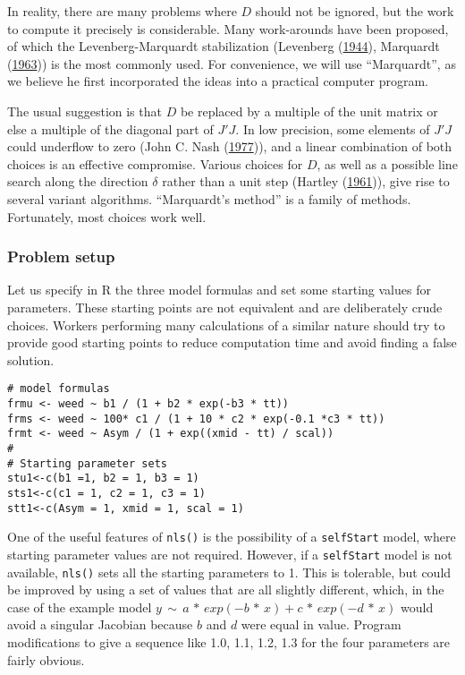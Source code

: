 In reality, there are many problems where \(D\) should not be ignored, but the work
to compute it precisely is considerable. Many work-arounds have been
proposed, of which the Levenberg-Marquardt stabilization
(Levenberg (\protect\hyperlink{ref-Levenberg1944}{1944}), Marquardt (\protect\hyperlink{ref-Marquardt1963}{1963})) is
the most commonly used. For convenience, we will use ``Marquardt'', as we believe he
first incorporated the ideas into a practical computer program.

The usual suggestion is that \(D\) be replaced by a multiple of the unit matrix or else
a multiple of the diagonal part of \(J' J\). In low precision, some elements of
\(J' J\) could underflow to zero (John C. Nash (\protect\hyperlink{ref-jn77ima}{1977})), and a linear combination of both
choices is an effective compromise. Various choices for
\(D\), as well as a possible line search along the
direction \(\delta\) rather than a unit step (Hartley (\protect\hyperlink{ref-Hartley1961}{1961})),
give rise to several variant
algorithms. ``Marquardt's method'' is a family of methods. Fortunately, most choices
work well.

\hypertarget{problem-setup}{%
\subsubsection{Problem setup}\label{problem-setup}}

Let us specify in R the three model formulas and set some starting
values for parameters. These starting points are not equivalent and
are deliberately crude choices. Workers performing many calculations
of a similar nature should try to provide good starting points to reduce
computation time and avoid finding a false solution.

\begin{verbatim}
# model formulas
frmu <- weed ~ b1 / (1 + b2 * exp(-b3 * tt))
frms <- weed ~ 100* c1 / (1 + 10 * c2 * exp(-0.1 *c3 * tt))
frmt <- weed ~ Asym / (1 + exp((xmid - tt) / scal))
#
# Starting parameter sets
stu1<-c(b1 =1, b2 = 1, b3 = 1)
sts1<-c(c1 = 1, c2 = 1, c3 = 1)
stt1<-c(Asym = 1, xmid = 1, scal = 1)
\end{verbatim}

One of the useful features of \texttt{nls()} is the possibility of a \texttt{selfStart} model,
where starting parameter values are not required. However, if a \texttt{selfStart} model
is not available, \texttt{nls()} sets all the starting parameters
to 1. This is tolerable, but could be improved by using a set of values
that are all slightly different, which, in the case of the example
model \(y \,\sim\, a \,*\, exp(-b \,*\, x) + c\,*\,exp(-d \,*\, x)\)
would avoid a singular Jacobian because \(b\) and \(d\) were equal in value.
Program modifications to give a sequence like 1.0, 1.1, 1.2, 1.3 for the four
parameters are fairly obvious.

